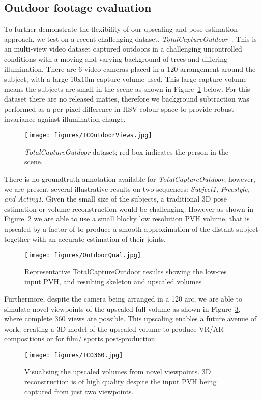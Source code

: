 \documentclass[runningheads]{llncs}
\begin{document}
\subsection{Outdoor footage evaluation}
To further demonstrate the flexibility of our upscaling and pose estimation approach, we test on a recent challenging dataset, \emph{TotalCaptureOutdoor}~\cite{Malleson3DV17}. This is an multi-view video dataset captured outdoors in a challenging uncontrolled conditions with a moving and varying background of trees and differing illumination. There are 6 video cameras placed in a 120 arrangement around the subject, with a large 10x10m capture volume used. This large capture volume means the subjects are small in the scene as shown in Figure~\ref{fig:TCoutdoorviews} below. For this dataset there are no released mattes, therefore we background subtraction was performed as a per pixel difference in HSV colour space to provide robust invariance against illumination change.
\begin{figure}[htb]
\centering
\texttt{[image: figures/TCOutdoorViews.jpg]}
\caption{{\em TotalCaptureOutdoor} dataset; red box indicates the person in the scene.}
\label{fig:TCoutdoorviews}
\end{figure}
There is no groundtruth annotation available for \emph{TotalCaptureOutdoor}, however, we are present several illustrative results on two sequences: {\em Subject1, Freestyle, and Acting1}. Given the small size of the subjects, a traditional 3D pose estimation or volume reconstruction would be challenging. However as shown in Figure~\ref{fig:OutdoorQual} we are able to use a small blocky low resolution PVH volume, that is upscaled by a factor of  to produce a smooth approximation of the distant subject together with an accurate estimation of their joints. 
\begin{figure}[htb]
\centering
\texttt{[image: figures/OutdoorQual.jpg]}
\caption{Representative TotalCaptureOutdoor results showing  the low-res input PVH, and resulting skeleton and upscaled volumes}
\label{fig:OutdoorQual}
\squeezeup
\squeezeup
\end{figure}
Furthermore, despite the camera being arranged in a 120 arc, we are able to simulate novel viewpoints of the upscaled full volume as shown in Figure~\ref{fig:TCO360}, where complete 360 views are possible. This upscaling enables a future avenue of work, creating a  3D model of the upscaled volume to produce VR/AR compositions or for film/ sports post-production.
\begin{figure}[htb]
\centering
\texttt{[image: figures/TCO360.jpg]}
\caption{Visualising the upscaled volumes from novel viewpoints.  3D reconstruction is of high quality despite the input PVH being captured from just two viewpoints.}
\label{fig:TCO360}
\end{figure}
\end{document}
